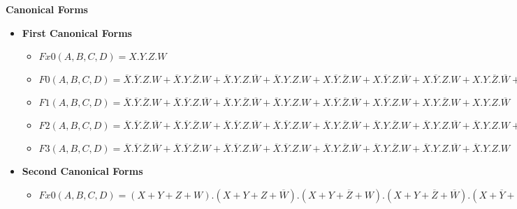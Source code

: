 \textbf{Canonical Forms }
\begin{itemize}
\item \textbf{First Canonical Forms }
    \begin{itemize}
    
        \item $Fx0(A,B,C,D) =  X.Y.Z.W$
    
        \item $F0(A,B,C,D) =  \overline{X}.\overline{Y}.Z.W + \overline{X}.Y.\overline{Z}.W + \overline{X}.Y.Z.\overline{W} + \overline{X}.Y.Z.W + X.\overline{Y}.\overline{Z}.W + X.\overline{Y}.Z.\overline{W} + X.\overline{Y}.Z.W + X.Y.\overline{Z}.\overline{W} + X.Y.\overline{Z}.W + X.Y.Z.\overline{W}$
    
        \item $F1(A,B,C,D) =  \overline{X}.\overline{Y}.\overline{Z}.W + \overline{X}.\overline{Y}.Z.\overline{W} + \overline{X}.Y.\overline{Z}.\overline{W} + \overline{X}.Y.Z.W + X.\overline{Y}.\overline{Z}.\overline{W} + X.\overline{Y}.Z.W + X.Y.\overline{Z}.W + X.Y.Z.\overline{W}$
    
        \item $F2(A,B,C,D) =  \overline{X}.\overline{Y}.\overline{Z}.\overline{W} + \overline{X}.\overline{Y}.\overline{Z}.W + \overline{X}.\overline{Y}.Z.\overline{W} + \overline{X}.\overline{Y}.Z.W + \overline{X}.Y.\overline{Z}.\overline{W} + \overline{X}.Y.\overline{Z}.W + \overline{X}.Y.Z.\overline{W} + \overline{X}.Y.Z.W + X.\overline{Y}.Z.W + X.Y.\overline{Z}.\overline{W}$
    
        \item $F3(A,B,C,D) =  \overline{X}.\overline{Y}.\overline{Z}.\overline{W} + \overline{X}.\overline{Y}.\overline{Z}.W + \overline{X}.\overline{Y}.Z.\overline{W} + \overline{X}.\overline{Y}.Z.W + \overline{X}.Y.\overline{Z}.\overline{W} + \overline{X}.Y.\overline{Z}.W + \overline{X}.Y.Z.\overline{W} + \overline{X}.Y.Z.W$
    
    \end{itemize}

\item \textbf{Second Canonical Forms }
    \begin{itemize}
    
        \item $Fx0(A,B,C,D) =  (X+Y+Z+W) . (X+Y+Z+\overline{W}) . (X+Y+\overline{Z}+W) . (X+Y+\overline{Z}+\overline{W}) . (X+\overline{Y}+Z+W) . (X+\overline{Y}+Z+\overline{W}) . (X+\overline{Y}+\overline{Z}+W) . (X+\overline{Y}+\overline{Z}+\overline{W}) . (\overline{X}+Y+Z+W) . (\overline{X}+Y+Z+\overline{W}) . (\overline{X}+Y+\overline{Z}+W) . (\overline{X}+Y+\overline{Z}+\overline{W}) . (\overline{X}+\overline{Y}+Z+W) . (\overline{X}+\overline{Y}+Z+\overline{W}) . (\overline{X}+\overline{Y}+\overline{Z}+W)$
    

\end{itemize}
\end{itemize}
